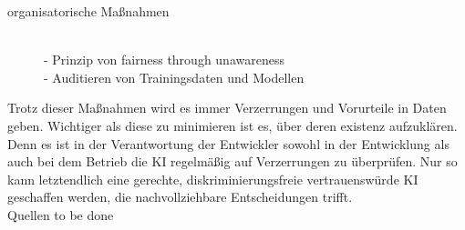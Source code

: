 \begin{onehalfspace}
\begin{description}
            \item[organisatorische Maßnahmen] \hfill \\
            - Prinzip von \glqq{}fairness through unawareness\grqq{} \cite{hagendorff2019maschinelles}
            \\
            - Auditieren von Trainingsdaten und Modellen \cite{hagendorff2019maschinelles}
        \end{description}
        Trotz dieser Maßnahmen wird es immer Verzerrungen und Vorurteile in Daten geben. Wichtiger als diese zu minimieren ist es, über deren existenz aufzuklären. Denn es ist in der Verantwortung der Entwickler sowohl in der Entwicklung als auch bei dem Betrieb die \ac*{KI} regelmäßig auf Verzerrungen zu überprüfen.\cite{Drew2019} Nur so kann letztendlich eine gerechte, diskriminierungsfreie vertrauenswürde \ac*{KI} geschaffen werden, die nachvollziehbare Entscheidungen trifft.
        \\
        Quellen to be done
        \cite{Drew2019}\cite{Dilmegani2020}\cite{hagendorff2019maschinelles}
        
    \newpage
\end{onehalfspace}